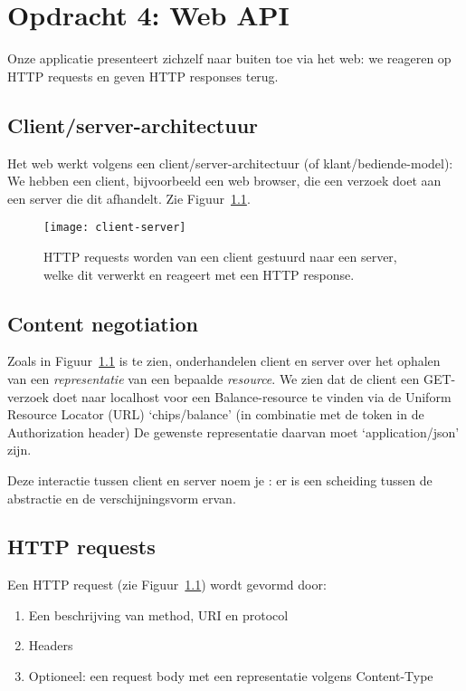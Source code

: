 \chapter{Opdracht 4: Web API}
Onze applicatie presenteert zichzelf naar buiten toe via het web:
we reageren op HTTP requests en geven HTTP responses terug.

\section{Client/server-architectuur}
Het web werkt volgens een client/server-architectuur (of klant/bediende-model):
We hebben een client, bijvoorbeeld een web browser, die een verzoek doet 
aan een server die dit afhandelt. Zie Figuur~\ref{fig:client-server}.

\begin{figure}[H]
    \centering
    \texttt{[image: client-server]}
    \caption{HTTP requests worden van een client gestuurd naar een server, welke dit verwerkt en reageert met een HTTP response.}
    \label{fig:client-server}
\end{figure}

\section{Content negotiation}
Zoals in Figuur~\ref{fig:client-server} is te zien, 
onderhandelen client en server over het ophalen van een \textit{representatie}
van een bepaalde \textit{resource}. We zien dat de client een 
GET-verzoek doet naar localhost voor een Balance-resource te
vinden via de Uniform Resource Locator (URL) `chips/balance'
(in combinatie met de token in de Authorization header)
De gewenste representatie daarvan moet `application/json' zijn.

Deze interactie tussen client en server noem je :
er is een scheiding tussen de abstractie en de verschijningsvorm ervan.

\section{HTTP requests}
Een HTTP request (zie Figuur~\ref{fig:client-server}) wordt gevormd door:
\begin{enumerate}
    \item Een beschrijving van method, URI en protocol
    \item Headers
    \item Optioneel: een request body met een representatie volgens Content-Type
\end{enumerate}

